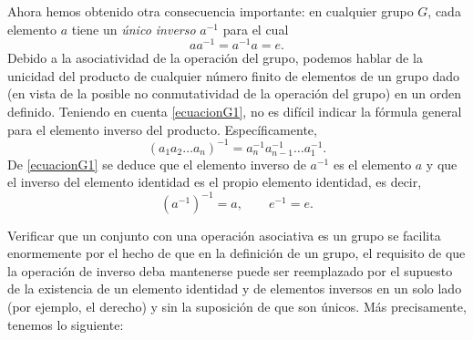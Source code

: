 Ahora hemos obtenido otra consecuencia importante: en cualquier grupo $G$, cada elemento $a$ tiene un \emph{único inverso} $a^{-1}$ para el cual
\begin{equation}
    aa^{-1} = a^{-1}a = e. \label{ecuacionG1}
\end{equation}
Debido a la asociatividad de la operación del grupo, podemos hablar de la unicidad del producto de cualquier número finito de elementos de un grupo dado (en vista de la posible no conmutatividad de la operación del grupo) en un orden definido. Teniendo en cuenta \eqref{ecuacionG1}, no es difícil indicar la fórmula general para el elemento inverso del producto. Específicamente,
\begin{equation}
    (a_1 a_2 \dots a_n)^{-1} = a_n^{-1} a_{n-1}^{-1} \dots a_1^{-1}. \label{ecuacionG2}
\end{equation}
De \eqref{ecuacionG1} se deduce que el elemento inverso de $a^{-1}$ es el elemento $a$ y que el inverso del elemento identidad es el propio elemento identidad, es decir,
\begin{equation}
    \left(a^{-1}\right)^{-1} = a, \qquad e^{-1} = e. \label{ecuacionG3}
\end{equation}

Verificar que un conjunto con una operación asociativa es un grupo se facilita enormemente por el hecho de que en la definición de un grupo, el requisito de que la operación de inverso deba mantenerse puede ser reemplazado por el supuesto de la existencia de un elemento identidad y de elementos inversos en un solo lado (por ejemplo, el derecho) y sin la suposición de que son únicos. Más precisamente, tenemos lo siguiente:

